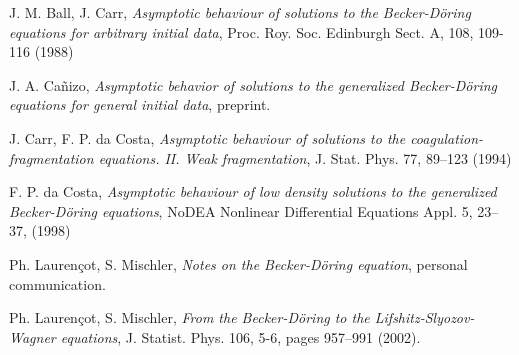 \documentclass{article}
\begin{document}
\begin{multicols}{3}
\begin{thebibliography}{}
 J. M. Ball, J. Carr, \emph{Asymptotic behaviour of
    solutions to the Becker-D\"oring equations for arbitrary initial
    data}, Proc. Roy. Soc. Edinburgh Sect. A, 108, 109-116 (1988)

 J. A. Cañizo, \emph{Asymptotic behavior of solutions to
    the generalized Becker-Döring equations for general initial data},
  preprint.

 J. Carr, F. P. da Costa, \emph{Asymptotic behaviour of
    solutions to the coagulation-fragmentation equations. II. Weak
    fragmentation}, J. Stat. Phys. 77, 89--123 (1994)

 F. P. da Costa, \emph{Asymptotic behaviour of low
    density solutions to the generalized Becker-D\"oring equations},
  NoDEA Nonlinear Differential Equations Appl. 5, 23--37, (1998)

 Ph. Lauren\c{c}ot, S. Mischler, \emph{Notes on the
    Becker-D\"oring equation}, personal communication.

 Ph. Lauren{\c{c}}ot, S. Mischler, \emph{From the
    {B}ecker-{D}\"oring to the {L}ifshitz-{S}lyozov-{W}agner
    equations}, J. Statist. Phys. 106, 5-6, pages 957--991 (2002).

\end{thebibliography}


\end{multicols}
\end{document}
